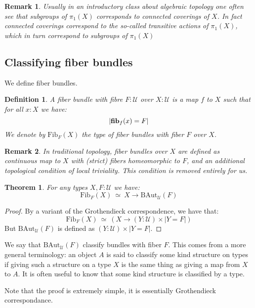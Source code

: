 \documentclass{article}
\newcommand{\sse}[1]{\medbreak \subsection{#1}}
\newcommand{\U}{{\mathcal U}}
\renewcommand{\r}{\rightarrow}
\newcommand{\fib}{\mathrm{\bf fib}}
\newcommand{\B}{\mathrm{B}}
\newcommand{\Aut}{\mathrm{Aut}}
\newcommand{\Set}{\mathrm{Set}}
\newtheorem{definition}{Definition}
\newtheorem{theorem}{Theorem}
\newtheorem{remark}{Remark}
\begin{document}

\begin{remark}
Usually in an introductory class about algebraic topology one often see that subgroups of $\pi_1(X)$ corresponds to connected coverings of $X$. In fact connected coverings correspond to the so-called \emph{transitive} actions of $\pi_1(X)$, which in turn correspond to subgroups of $\pi_1(X)$
\end{remark}



\sse{Classifying fiber bundles}

We define fiber bundles.

\begin{definition}
A fiber bundle with fibre $F:\U$ over $X:\U$ is a map $f$ to $X$ such that for all $x:X$ we have:
\[| \fib_f(x)=F| \]
We denote by $\mathrm{Fib}_F(X)$ the type of fiber bundles with fiber $F$ over $X$.
\end{definition}

\begin{remark}
In traditional topology, fiber bundles over $X$ are defined as continuous map to $X$ with (strict) fibers homeomorphic to $F$, and an additional topological condition of \emph{local triviality}. This condition is removed entirely for us.
\end{remark}

\begin{theorem}
For any types $X,F:\U$ we have:
\[\mathrm{Fib}_F(X) \ \simeq \ X\r \B\Aut_\U(F)\]
\end{theorem}
\begin{proof}
By a variant of the Grothendieck correspondence, we have that:
\[\mathrm{Fib}_F(X) \ \simeq \ (X\r (Y:\U)\times|Y=F|)\]
But $\B\Aut_\U(F)$ is defined as $(Y:\U)\times |Y=F|$.
\end{proof}

We say that $\B \Aut_\U(F)$ classify bundles with fiber $F$. This comes from a more general terminology: an object $A$ is said to classify some kind structure on types if giving such a structure on a type $X$ is the same thing as giving a map from $X$ to $A$. It is often useful to know that some kind structure is classified by a type.

Note that the proof is extremely simple, it is essentially Grothendieck correspondance.
\end{document}
